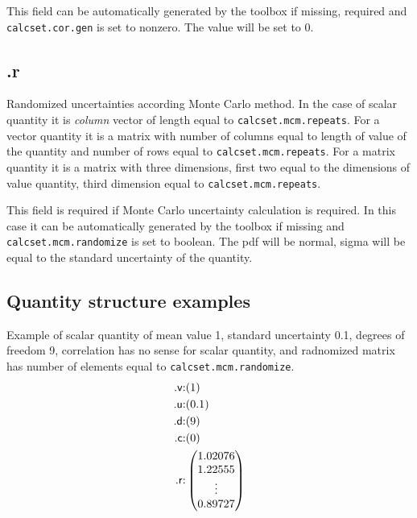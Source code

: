 \documentclass[12pt,a4paper,oneside]{report} %
\begin{document}
This field can be automatically generated by the toolbox if missing, required and \lstinline{calcset.cor.gen}
is set to nonzero. The value will be set to 0.

\subsection{\textsf{.r}} %
Randomized uncertainties according Monte Carlo method. In the case of scalar quantity it is
\emph{column} vector of length equal to \lstinline{calcset.mcm.repeats}. For a vector quantity it is a matrix with number
of columns equal to length of value of the quantity and number of rows equal to
\lstinline{calcset.mcm.repeats}. For a matrix quantity it is a matrix with three dimensions, first
two equal to the dimensions of value quantity, third dimension equal to
\lstinline{calcset.mcm.repeats}.

This field is required if Monte Carlo uncertainty calculation is required. In this case it can be
automatically generated by the toolbox if missing and \lstinline{calcset.mcm.randomize} is set to
boolean. The pdf will be normal, sigma will be equal to the standard uncertainty of the quantity.

\subsection{Quantity structure examples} %
Example of scalar quantity of mean value 1, standard uncertainty 0.1, degrees of freedom 9, correlation has no
sense for scalar quantity, and radnomized matrix has number of elements equal to \lstinline{calcset.mcm.randomize}.
\begin{eqnarray*}
        \text{\textsf{.v}:} &(1)\\
        \text{\textsf{.u}:} &(0.1)\\
        \text{\textsf{.d}:} &(9)\\
        \text{\textsf{.c}:} &(0)\\
        \text{\textsf{.r}:} &\begin{pmatrix}
                1.02076 \\
                1.22555 \\
                \vdots\\
                0.89727 \\
        \end{pmatrix}\\
\end{eqnarray*}
\end{document}
